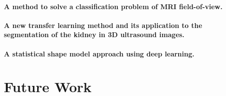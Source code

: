 \paragraph*{A method to solve a classification problem of MRI field-of-view.}

\paragraph*{A new transfer learning method and its application to the segmentation of the kidney in 3D ultrasound images.}

\paragraph*{A statistical shape model approach using deep learning.}

\section{Future Work}
